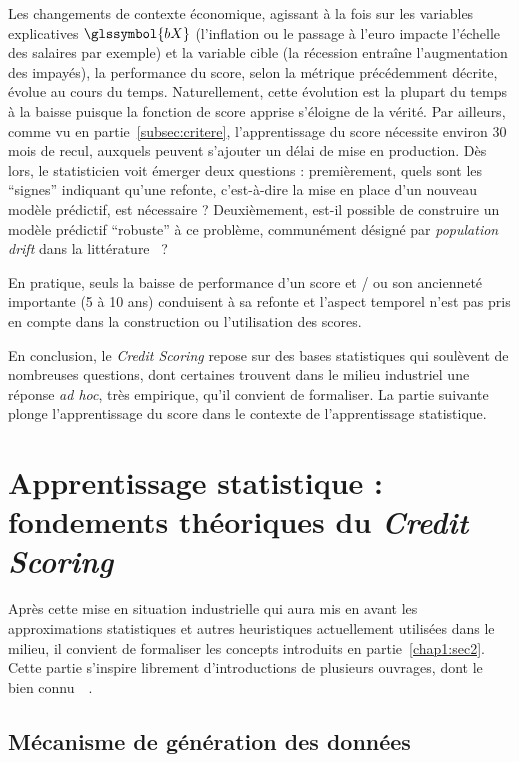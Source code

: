 Les changements de contexte économique, agissant à la fois sur les variables explicatives $\glssymbol{bX}$ (l'inflation ou le passage à l'euro impacte l'échelle des salaires par exemple) et la variable cible (la récession entraîne l'augmentation des impayés), la performance du \gls{score}, selon la métrique précédemment décrite, évolue au cours du temps. Naturellement, cette évolution est la plupart du temps à la baisse puisque la fonction de \gls{score} apprise s'éloigne de la vérité. Par ailleurs, comme vu en partie~\ref{subsec:critere}, l'apprentissage du \gls{score} nécessite environ 30 mois de recul, auxquels peuvent s'ajouter un délai de mise en production. Dès lors, le statisticien voit émerger deux questions : premièrement, quels sont les ``signes'' indiquant qu'une refonte, c'est-à-dire la mise en place d'un nouveau modèle prédictif, est nécessaire ? Deuxièmement, est-il possible de construire un modèle prédictif ``robuste'' à ce problème, communément désigné par \textit{population drift} dans la littérature~\cite{hand1997statistical} ?

En pratique, seuls la baisse de performance d'un \gls{score} et / ou son ancienneté importante (5 à 10 ans) conduisent à sa refonte et l'aspect temporel n'est pas pris en compte dans la construction ou l'utilisation des \glspl{score}.

\medskip

En conclusion, le \textit{Credit Scoring} repose sur des bases statistiques qui soulèvent de nombreuses questions, dont certaines trouvent dans le milieu industriel une réponse \textit{ad hoc}, très empirique, qu'il convient de formaliser. La partie suivante plonge l'apprentissage du \gls{score} dans le contexte de l'apprentissage statistique.

\section{Apprentissage statistique : fondements théoriques du \textit{Credit Scoring}} \label{chap1:sec3}

Après cette mise en situation industrielle qui aura mis en avant les approximations statistiques et autres heuristiques actuellement utilisées dans le milieu, il convient de formaliser les concepts introduits en partie~\ref{chap1:sec2}. Cette partie s'inspire librement d'introductions de plusieurs ouvrages, dont le bien connu~~\cite{friedman2001elements}.

\subsection{Mécanisme de génération des données}

